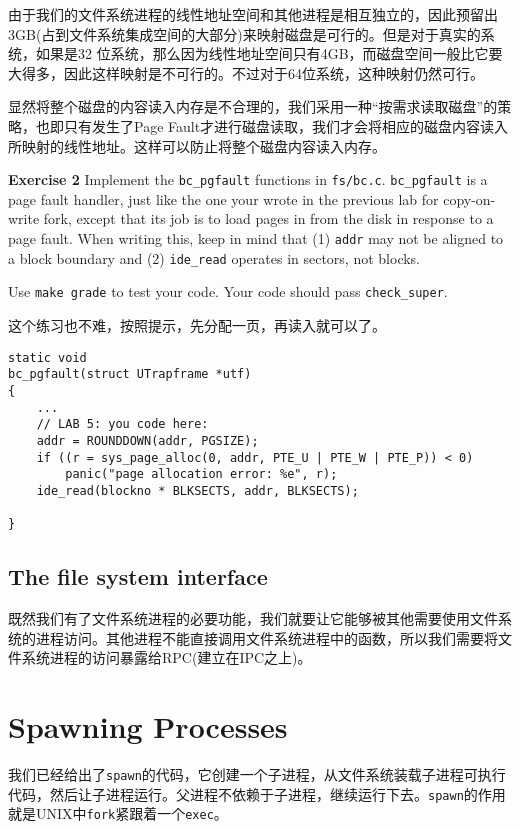 \documentclass[11pt]{article}
\begin{document}
由于我们的文件系统进程的线性地址空间和其他进程是相互独立的，因此预留出3GB(占到文件系统集成空间的大部分)来映射磁盘是可行的。但是对于真实的系统，如果是32 位系统，那么因为线性地址空间只有4GB，而磁盘空间一般比它要大得多，因此这样映射是不可行的。不过对于64位系统，这种映射仍然可行。 

显然将整个磁盘的内容读入内存是不合理的，我们采用一种“按需求读取磁盘”的策略，也即只有发生了Page Fault才进行磁盘读取，我们才会将相应的磁盘内容读入所映射的线性地址。这样可以防止将整个磁盘内容读入内存。

\begin{framed}
\noindent\textbf{Exercise 2} Implement the \lstinline|bc_pgfault| functions in \lstinline|fs/bc.c|. \lstinline|bc_pgfault| is a page fault handler, just like the one your wrote in the previous lab for copy-on-write fork, except that its job is to load pages in from the disk in response to a page fault. When writing this, keep in mind that (1) \lstinline|addr| may not be aligned to a block boundary and (2) \lstinline|ide_read| operates in sectors, not blocks.

Use \lstinline|make grade| to test your code. Your code should pass \lstinline|check_super|.
\end{framed}

这个练习也不难，按照提示，先分配一页，再读入就可以了。
\begin{lstlisting}[title=fs/bc.c]
static void
bc_pgfault(struct UTrapframe *utf)
{
	...
	// LAB 5: you code here:
	addr = ROUNDDOWN(addr, PGSIZE);
	if ((r = sys_page_alloc(0, addr, PTE_U | PTE_W | PTE_P)) < 0)
		panic("page allocation error: %e", r);
	ide_read(blockno * BLKSECTS, addr, BLKSECTS); 

}
\end{lstlisting}

\subsection{The file system interface}
既然我们有了文件系统进程的必要功能，我们就要让它能够被其他需要使用文件系统的进程访问。其他进程不能直接调用文件系统进程中的函数，所以我们需要将文件系统进程的访问暴露给RPC(建立在IPC之上)。

\section{Spawning Processes}
我们已经给出了\lstinline|spawn|的代码，它创建一个子进程，从文件系统装载子进程可执行代码，然后让子进程运行。父进程不依赖于子进程，继续运行下去。\lstinline|spawn|的作用就是UNIX中\lstinline|fork|紧跟着一个\lstinline|exec|。
\end{document}
